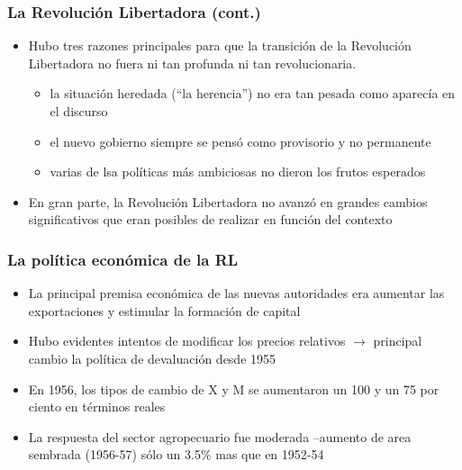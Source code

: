 \documentclass[14pt,aspectratio=169]{beamer}
\begin{document}
  \begin{frame}\frametitle{La Revolución Libertadora (cont.)}
                 \begin{itemize}\itemsep 5pt \medskip
                 \item Hubo tres razones principales para que la
                   transición de la Revolución Libertadora no fuera ni
                   tan profunda ni tan revolucionaria.
                   \begin{itemize}\itemsep 5pt \medskip
                   \item la situación heredada (``la herencia'') no
                     era tan pesada como aparecía en el discurso
                     \item el nuevo gobierno siempre se pensó como
                       provisorio y no permanente
                       \item varias de lsa políticas más ambiciosas no
                         dieron los frutos esperados
                       \end{itemize}
                       \item En gran parte, la Revolución Libertadora
                         no avanzó en grandes cambios significativos
                         que eran posibles de realizar en función del contexto
                   \end{itemize}
               \end{frame}


 \begin{frame}\frametitle{La política económica de la RL}
                 \begin{itemize}\itemsep 5pt \medskip
                 \item La principal premisa económica de las nuevas
                   autoridades era aumentar las exportaciones y
                   estimular la formación de capital
                   \item Hubo evidentes intentos de modificar los
                     precios relativos $\longrightarrow$ principal
                     cambio la política de devaluación desde 1955
                     \item En 1956, los tipos de cambio de X y M se
                       aumentaron un 100 y un 75 por ciento en
                       términos reales
                       \item La respuesta del sector agropecuario fue
                         moderada --aumento de area sembrada (1956-57) sólo un
                         3.5\% mas que en 1952-54
                   \end{itemize}
               \end{frame}
               
\end{document}
